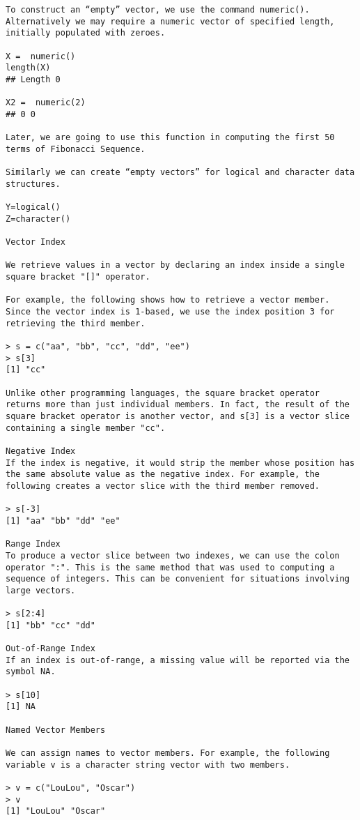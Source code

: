 \begin{itemize}
\begin{framed}
\begin{verbatim}
To construct an “empty” vector, we use the command numeric(). Alternatively we may require a numeric vector of specified length, initially populated with zeroes.

X =  numeric()
length(X)
## Length 0

X2 =  numeric(2)
## 0 0 

Later, we are going to use this function in computing the first 50 terms of Fibonacci Sequence.

Similarly we can create “empty vectors” for logical and character data structures.

Y=logical()
Z=character()

Vector Index

We retrieve values in a vector by declaring an index inside a single square bracket "[]" operator.

For example, the following shows how to retrieve a vector member. Since the vector index is 1-based, we use the index position 3 for retrieving the third member.

> s = c("aa", "bb", "cc", "dd", "ee") 
> s[3] 
[1] "cc"

Unlike other programming languages, the square bracket operator returns more than just individual members. In fact, the result of the square bracket operator is another vector, and s[3] is a vector slice containing a single member "cc".

Negative Index
If the index is negative, it would strip the member whose position has the same absolute value as the negative index. For example, the following creates a vector slice with the third member removed.

> s[-3] 
[1] "aa" "bb" "dd" "ee"

Range Index
To produce a vector slice between two indexes, we can use the colon operator ":". This is the same method that was used to computing a sequence of integers. This can be convenient for situations involving large vectors.

> s[2:4] 
[1] "bb" "cc" "dd"

Out-of-Range Index
If an index is out-of-range, a missing value will be reported via the symbol NA.

> s[10] 
[1] NA

Named Vector Members

We can assign names to vector members. For example, the following variable v is a character string vector with two members.

> v = c("LouLou", "Oscar") 
> v 
[1] "LouLou" "Oscar"


\end{verbatim}
\end{framed}
\end{itemize}
